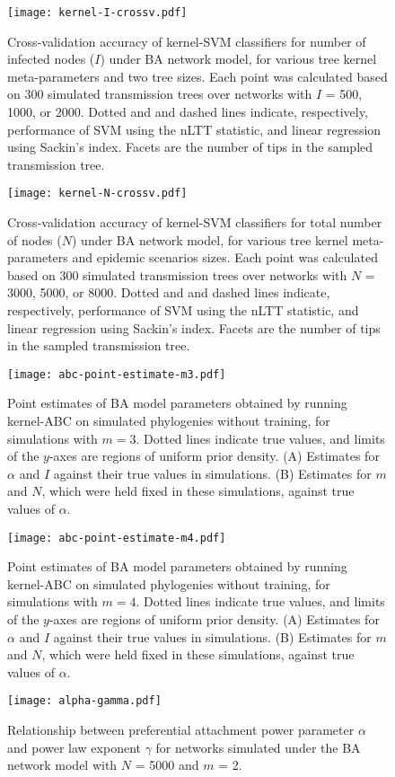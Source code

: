 \documentclass[12pt]{article}
\begin{document}
\begin{figure}[ht]
  \centering
  \texttt{[image: kernel-I-crossv.pdf]}
  \caption{Cross-validation accuracy of kernel-SVM classifiers for number of
      infected nodes ($I$) under BA network model, for various tree
      kernel meta-parameters and two tree sizes. Each point was calculated
      based on 300 simulated transmission trees over networks with $I$ = 500,
      1000, or 2000. Dotted and and dashed lines indicate, respectively,
      performance of SVM using the nLTT statistic, and linear regression
      using Sackin's index. Facets are the number of tips in the sampled
      transmission tree.
  }
  \label{fig:Icrossv}
\end{figure}

\begin{figure}[ht]
  \centering
  \texttt{[image: kernel-N-crossv.pdf]}
  \caption{Cross-validation accuracy of kernel-SVM classifiers for total number
      of nodes ($N$) under BA network model, for various tree kernel
      meta-parameters and epidemic scenarios sizes. Each point was calculated
      based on 300 simulated transmission trees over networks with $N$ = 3000,
      5000, or 8000. Dotted and and dashed lines indicate, respectively,
      performance of SVM using the nLTT statistic, and linear regression
      using Sackin's index. Facets are the number of tips in the sampled
      transmission tree.
  }
  \label{fig:Ncrossv}
\end{figure}

\begin{figure}[ht]
  \centering
  \texttt{[image: abc-point-estimate-m3.pdf]}
  \caption{
    Point estimates of BA model parameters obtained by running kernel-ABC
    on simulated phylogenies without training, for simulations with $m = 3$.
    Dotted lines indicate true values, and limits of the $y$-axes are regions
    of uniform prior density. (A) Estimates for $\alpha$ and $I$ against their
    true values in simulations. (B) Estimates for $m$ and $N$, which were held
    fixed in these simulations, against true values of $\alpha$.
  }
  \label{fig:abcptm3}
\end{figure}

\begin{figure}[ht]
  \centering
  \texttt{[image: abc-point-estimate-m4.pdf]}
  \caption{
    Point estimates of BA model parameters obtained by running kernel-ABC
    on simulated phylogenies without training, for simulations with $m = 4$.
    Dotted lines indicate true values, and limits of the $y$-axes are regions
    of uniform prior density. (A) Estimates for $\alpha$ and $I$ against their
    true values in simulations. (B) Estimates for $m$ and $N$, which were held
    fixed in these simulations, against true values of $\alpha$.
  }
  \label{fig:abcptm4}
\end{figure}

\begin{figure}[ht]
  \centering
  \texttt{[image: alpha-gamma.pdf]}
  \caption{
      Relationship between preferential attachment power parameter $\alpha$
      and power law exponent $\gamma$ for networks simulated under the BA
      network model with $N$ = 5000 and $m$ = 2.
  }
  \label{fig:gamma}
\end{figure}
\end{document}
